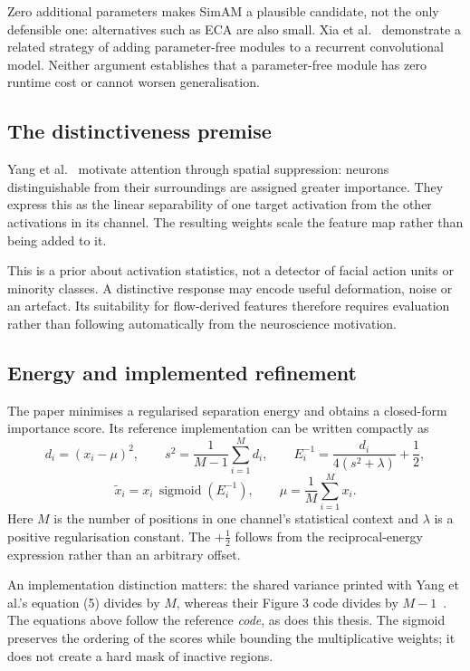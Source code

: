 Zero additional parameters makes SimAM a plausible candidate, not the only defensible one: alternatives such as ECA are also small. Xia et al.~\cite{xia2020b} demonstrate a related strategy of adding parameter-free modules to a recurrent convolutional model. Neither argument establishes that a parameter-free module has zero runtime cost or cannot worsen generalisation.

\subsection{The distinctiveness premise}
\label{sec:simam-premise}

Yang et al.~\cite{yang2021} motivate attention through spatial suppression: neurons distinguishable from their surroundings are assigned greater importance. They express this as the linear separability of one target activation from the other activations in its channel. The resulting weights scale the feature map rather than being added to it.

This is a prior about activation statistics, not a detector of facial action units or minority classes. A distinctive response may encode useful deformation, noise or an artefact. Its suitability for flow-derived features therefore requires evaluation rather than following automatically from the neuroscience motivation.

\subsection{Energy and implemented refinement}
\label{sec:simam-energy}

The paper minimises a regularised separation energy and obtains a closed-form importance score. Its reference implementation can be written compactly as
\[
    d_i=(x_i-\mu)^2,\qquad
    s^2=\frac{1}{M-1}\sum_{i=1}^{M}d_i,\qquad
    E_i^{-1}=\frac{d_i}{4(s^2+\lambda)}+\frac{1}{2},
\]
\[
    \widetilde{x}_i=x_i\,\operatorname{sigmoid}(E_i^{-1}),
    \qquad \mu=\frac{1}{M}\sum_{i=1}^{M}x_i.
\]
Here $M$ is the number of positions in one channel's statistical context and $\lambda$ is a positive regularisation constant. The $+\tfrac12$ follows from the reciprocal-energy expression rather than an arbitrary offset.

An implementation distinction matters: the shared variance printed with Yang et al.'s equation (5) divides by $M$, whereas their Figure 3 code divides by $M-1$~\cite{yang2021}. The equations above follow the reference \emph{code}, as does this thesis. The sigmoid preserves the ordering of the scores while bounding the multiplicative weights; it does not create a hard mask of inactive regions.

